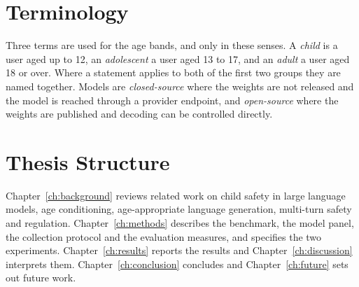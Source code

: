 \section{Terminology}
\label{sec:intro_terminology}

Three terms are used for the age bands, and only in these senses. A \emph{child}
is a user aged up to 12, an \emph{adolescent} a user aged 13 to 17, and an
\emph{adult} a user aged 18 or over. Where a statement applies to both of the
first two groups they are named together. Models are \emph{closed-source} where
the weights are not released and the model is reached through a provider
endpoint, and \emph{open-source} where the weights are published and decoding can
be controlled directly.

\section{Thesis Structure}
\label{sec:intro_structure}

Chapter~\ref{ch:background} reviews related work on child safety in large
language models, age conditioning, age-appropriate language generation,
multi-turn safety and regulation. Chapter~\ref{ch:methods} describes the
benchmark, the model panel, the collection protocol and the evaluation measures,
and specifies the two experiments. Chapter~\ref{ch:results} reports the results
and Chapter~\ref{ch:discussion} interprets them. Chapter~\ref{ch:conclusion}
concludes and Chapter~\ref{ch:future} sets out future work.
